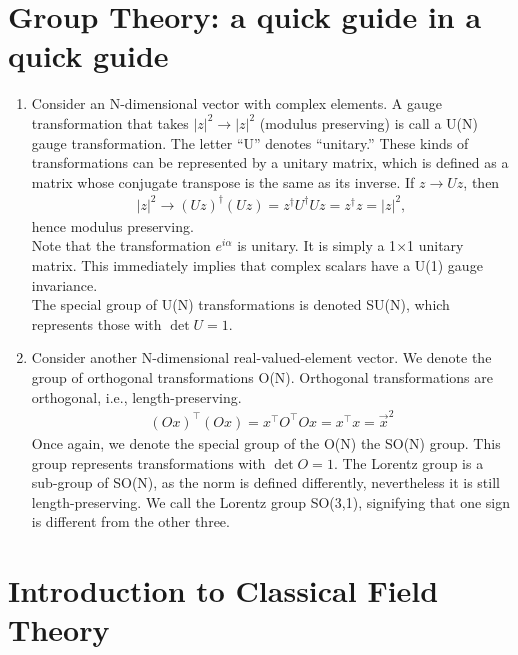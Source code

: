 \documentclass[a4paper,11pt]{article}
\numberwithin{equation}{section}
\theoremstyle{definition}
\begin{document}
\newpage
\section{Group Theory: a quick guide in a quick guide}
\begin{enumerate}
	\item Consider an N-dimensional vector with complex elements. A gauge transformation that takes $\vert z\vert^2 \to \vert z \vert^2$ (modulus preserving) is call a U(N) gauge transformation. The letter ``U'' denotes ``unitary.'' These kinds of transformations can be represented by a unitary matrix, which is defined as a matrix whose conjugate transpose is the same as its inverse. If $z\to Uz$, then 
	\begin{align}
	\vert z\vert^2 \to (Uz)^\dagger(Uz) = z^\dagger U^\dagger U z =z^\dagger z =\vert z\vert^2,
	\end{align} 
	hence modulus preserving.\\
	
	Note that the transformation $e^{i\alpha}$ is unitary. It is simply a 1$\times$1 unitary matrix. This immediately implies that complex scalars have a U(1) gauge invariance.\\
	
	The special group of U(N) transformations is denoted SU(N), which represents those with $\det U= 1$. 
	\item Consider another N-dimensional real-valued-element vector. We denote the group of orthogonal transformations O(N). Orthogonal transformations are orthogonal, i.e., length-preserving. 
	\begin{align}
	(Ox)^\top(Ox) = x^\top O^\top O x = x^\top x = \vec{x}^2
	\end{align} 
	Once again, we denote the special group of the O(N) the SO(N) group. This group represents transformations with $\det O = 1$. The Lorentz group is a sub-group of SO(N), as the norm is defined differently, nevertheless it is still length-preserving. We call the Lorentz group SO(3,1), signifying that one sign is different from the other three. 
\end{enumerate}



\newpage

\section{Introduction to Classical Field Theory}
\end{document}
